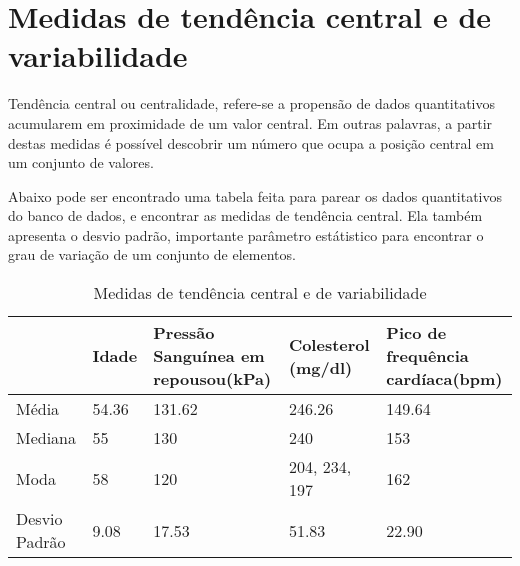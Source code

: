 \chapter{Medidas de tendência central e de variabilidade}

    Tendência central ou centralidade, refere-se a propensão de dados quantitativos acumularem
    em proximidade de um valor central. Em outras palavras, a partir destas medidas é possível 
    descobrir um número que ocupa a posição central em um conjunto de valores.

    Abaixo pode ser encontrado uma tabela feita para parear os dados quantitativos do banco de dados, 
    e encontrar as medidas de tendência central. Ela também apresenta o desvio padrão, importante 
    parâmetro estátistico para encontrar o grau de variação de um conjunto de elementos.

    \begin{table}[htb]
      \caption{Medidas de tendência central e de variabilidade}
      \centering
        \begin{tabular}{ |P{2.8cm} |P{2cm}|P{3cm}|P{3cm}|P{3cm}|  }
          \hline
            &        Idade & Pressão Sanguínea em repousou(kPa) & Colesterol  (mg/dl) & Pico de frequência cardíaca(bpm)\\
          \hline
          Média & 54.36 & 131.62 & 246.26 & 149.64 \\
          \hline
          Mediana & 55 & 130 & 240 & 153 \\
          \hline
          Moda & 58 & 120 & 204, 234, 197 & 162 \\
          \hline
          Desvio Padrão & 9.08 & 17.53 & 51.83 & 22.90 \\
          \hline
        \end{tabular}
    \end{table}

